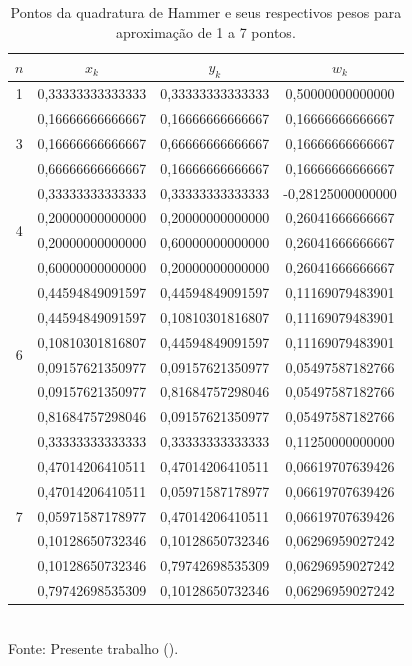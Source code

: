 \begin{table}[h!]
    \centering
    \caption{Pontos da quadratura de Hammer e seus respectivos pesos para aproximação de 1 a 7 pontos.}
    \begin{tabular}{cccc}
        \hline
        $n$                & $x_k$            & $y_k$            & $w_k$             \\ \hline
        1                  & 0,33333333333333 & 0,33333333333333 & 0,50000000000000  \\ \hline
        \multirow{3}{*}{3} & 0,16666666666667 & 0,16666666666667 & 0,16666666666667  \\
                           & 0,16666666666667 & 0,66666666666667 & 0,16666666666667  \\
                           & 0,66666666666667 & 0,16666666666667 & 0,16666666666667  \\ \hline
        \multirow{4}{*}{4} & 0,33333333333333 & 0,33333333333333 & -0,28125000000000 \\
                           & 0,20000000000000 & 0,20000000000000 & 0,26041666666667  \\
                           & 0,20000000000000 & 0,60000000000000 & 0,26041666666667  \\
                           & 0,60000000000000 & 0,20000000000000 & 0,26041666666667  \\ \hline
        \multirow{6}{*}{6} & 0,44594849091597 & 0,44594849091597 & 0,11169079483901  \\
                           & 0,44594849091597 & 0,10810301816807 & 0,11169079483901  \\
                           & 0,10810301816807 & 0,44594849091597 & 0,11169079483901  \\
                           & 0,09157621350977 & 0,09157621350977 & 0,05497587182766  \\
                           & 0,09157621350977 & 0,81684757298046 & 0,05497587182766  \\
                           & 0,81684757298046 & 0,09157621350977 & 0,05497587182766  \\ \hline
        \multirow{7}{*}{7} & 0,33333333333333 & 0,33333333333333 & 0,11250000000000  \\
                           & 0,47014206410511 & 0,47014206410511 & 0,06619707639426  \\
                           & 0,47014206410511 & 0,05971587178977 & 0,06619707639426  \\
                           & 0,05971587178977 & 0,47014206410511 & 0,06619707639426  \\
                           & 0,10128650732346 & 0,10128650732346 & 0,06296959027242  \\
                           & 0,10128650732346 & 0,79742698535309 & 0,06296959027242  \\
                           & 0,79742698535309 & 0,10128650732346 & 0,06296959027242  \\ \hline
    \end{tabular}
    \\Fonte: Presente trabalho (\the\year).
    \label{tab:QHammer}
\end{table}
